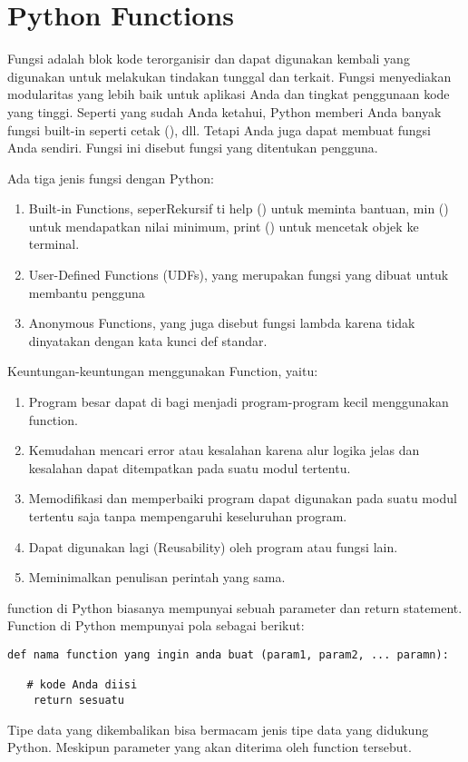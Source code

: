 \section{Python Functions}\par
Fungsi adalah blok kode terorganisir dan dapat digunakan kembali yang digunakan untuk melakukan tindakan tunggal dan terkait. Fungsi menyediakan modularitas yang lebih baik untuk aplikasi Anda dan tingkat penggunaan kode yang tinggi. Seperti yang sudah Anda ketahui, Python memberi Anda banyak fungsi built-in seperti cetak (), dll. Tetapi Anda juga dapat membuat fungsi Anda sendiri. Fungsi ini disebut fungsi yang ditentukan pengguna. \par

Ada tiga jenis fungsi dengan Python: \par
\begin{enumerate}
\item Built-in Functions, seperRekursif ti help () untuk meminta bantuan, min () untuk mendapatkan nilai minimum, print () untuk mencetak objek ke terminal.
\item User-Defined Functions (UDFs), yang merupakan fungsi yang dibuat untuk membantu pengguna
\item Anonymous Functions, yang juga disebut fungsi lambda karena tidak dinyatakan dengan kata kunci def standar.
\end{enumerate}

Keuntungan-keuntungan menggunakan Function, yaitu: \par
\begin{enumerate}
\item Program besar dapat di bagi menjadi program-program kecil menggunakan function.
\item Kemudahan mencari error atau kesalahan karena alur logika jelas dan kesalahan dapat ditempatkan pada suatu modul tertentu.
\item Memodifikasi dan memperbaiki program dapat digunakan pada suatu modul tertentu saja tanpa mempengaruhi keseluruhan program.
\item Dapat digunakan lagi (Reusability) oleh program atau fungsi lain.
\item Meminimalkan penulisan perintah yang sama. 
\end{enumerate}

function di Python biasanya mempunyai sebuah parameter dan return statement. Function di Python mempunyai pola sebagai berikut:
\begin{verbatim}
def nama function yang ingin anda buat (param1, param2, ... paramn):
   
   # kode Anda diisi
    return sesuatu
\end{verbatim}    
Tipe data yang dikembalikan bisa bermacam jenis tipe data yang didukung Python. Meskipun parameter yang akan diterima oleh function tersebut. 

